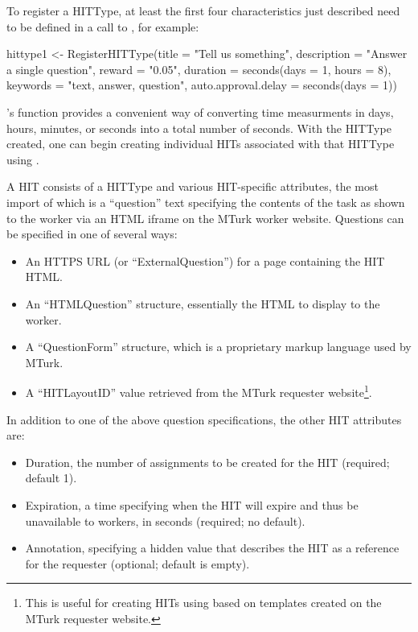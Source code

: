 To register a HITType, at least the first four characteristics just described need to be defined in a call to , for example:

\begin{example}
hittype1 <- RegisterHITType(title = "Tell us something", 
                            description = "Answer a single question", 
                            reward = "0.05", 
                            duration = seconds(days = 1, hours = 8), 
                            keywords = "text, answer, question", 
                            auto.approval.delay = seconds(days = 1))
\end{example}

's  function provides a convenient way of converting time measurments in days, hours, minutes, or seconds into a total number of seconds. With the HITType created, one can begin creating individual HITs associated with that HITType using .

A HIT consists of a HITType and various HIT-specific attributes, the most import of which is a ``question'' text specifying the contents of the task as shown to the worker via an HTML iframe on the MTurk worker website. Questions can be specified in one of several ways:

\begin{itemize}
	\item An HTTPS URL (or ``ExternalQuestion'') for a page containing the HIT HTML.
	\item An ``HTMLQuestion'' structure, essentially the HTML to display to the worker.
	\item A ``QuestionForm'' structure, which is a proprietary markup language used by MTurk.
	\item A ``HITLayoutID'' value retrieved from the MTurk requester website\footnote{This is useful for creating HITs using  based on templates created on the MTurk requester website.}.
\end{itemize}

\noindent In addition to one of the above question specifications, the other HIT attributes are:

\begin{itemize}
\item Duration, the number of assignments to be created for the HIT (required; default 1).
\item Expiration, a time specifying when the HIT will expire and thus be unavailable to workers, in seconds (required; no default).
\item Annotation, specifying a hidden value that describes the HIT as a reference for the requester (optional; default is empty).
\end{itemize}

